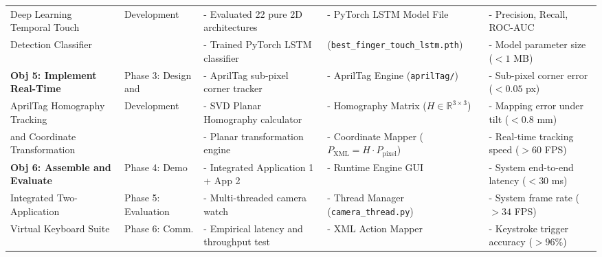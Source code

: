 \begin{table}[htbp]
{\begin{tabular}{l l l l l}
Deep Learning Temporal Touch & Development & - Evaluated 22 pure 2D architectures & - PyTorch LSTM Model File & - Precision, Recall, ROC-AUC \\
Detection Classifier & & - Trained PyTorch LSTM classifier & (\texttt{best\_finger\_touch\_lstm.pth}) & - Model parameter size ($< 1$ MB) \\
\midrule
\textbf{Obj 5: Implement Real-Time} & Phase 3: Design and & - AprilTag sub-pixel corner tracker & - AprilTag Engine (\texttt{aprilTag/}) & - Sub-pixel corner error ($< 0.05$ px) \\
AprilTag Homography Tracking & Development & - SVD Planar Homography calculator & - Homography Matrix ($H \in \mathbb{R}^{3 \times 3}$) & - Mapping error under tilt ($< 0.8$ mm) \\
and Coordinate Transformation & & - Planar transformation engine & - Coordinate Mapper ($P_{\text{XML}} = H \cdot P_{\text{pixel}}$) & - Real-time tracking speed ($> 60$ FPS) \\
\midrule
\textbf{Obj 6: Assemble and Evaluate} & Phase 4: Demo & - Integrated Application 1 + App 2 & - Runtime Engine GUI & - System end-to-end latency ($< 30$ ms) \\
Integrated Two-Application & Phase 5: Evaluation & - Multi-threaded camera watch & - Thread Manager (\texttt{camera\_thread.py}) & - System frame rate ($> 34$ FPS) \\
Virtual Keyboard Suite & Phase 6: Comm. & - Empirical latency and throughput test & - XML Action Mapper & - Keystroke trigger accuracy ($> 96\%$) \\
\bottomrule
\end{tabular}%
}
\end{table}

